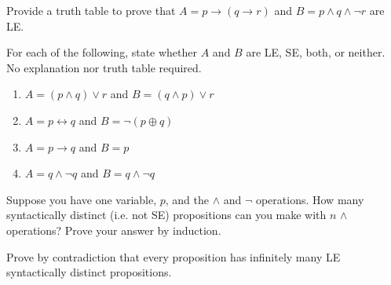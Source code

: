 \documentclass[solution, letterpaper]{cs20}
\begin{document}
\subproblem Provide a truth table to prove that $A  = p \to (q \to r)$ and $B = p \land q \land \neg r$ are LE.

\subproblem For each of the following, state whether $A$ and $B$ are LE, SE, both, or neither. No explanation nor truth table required.

\begin{enumerate}
\item $A = (p \land q) \lor r$ and $B = (q \land p) \lor r$
\item $A = p \leftrightarrow q$ and $B = \neg (p \oplus q)$
\item $A = p \to q$ and $B = p$
\item $A = q \land \neg q$ and $B = q \land \neg q$
\end{enumerate}

\subproblem Suppose you have one variable, $p$, and the $\land$ and $\neg$ operations. How many syntactically distinct (i.e. not SE) propositions can you make with $n$ $\land$ operations? Prove your answer by induction.

\subproblem Prove by contradiction that every proposition has infinitely many LE syntactically distinct propositions.
\end{document}

